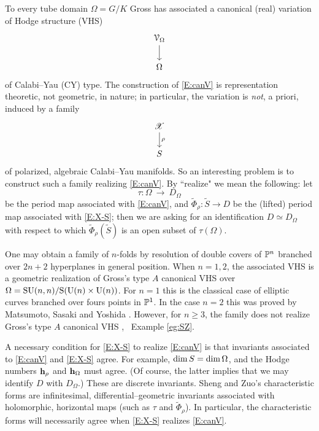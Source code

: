 \documentclass[12pt]{amsart}
\numberwithin{equation}{section}
\numberwithin{table}{section}
\numberwithin{figure}{section}
\begin{document}
To every tube domain $\Omega = G/K$ Gross \cite{MR1258484} has associated a canonical (real) variation of Hodge structure (VHS)
\begin{equation}\label{E:canV}
  \begin{tikzcd}  \cV_\Omega \arrow[d] \\ \Omega \end{tikzcd}
\end{equation}
of Calabi--Yau (CY) type.  The construction of \eqref{E:canV} is representation theoretic, not geometric, in nature; in particular, the variation is \emph{not}, a priori, induced by a family 
\begin{equation}\label{E:X-S}
  \begin{tikzcd}  \sX \arrow[d,"\rho"] \\ S \end{tikzcd}
\end{equation}
of polarized, algebraic Calabi--Yau manifolds.  So an interesting problem is to construct such a family realizing \eqref{E:canV}.  By ``realize" we mean the following: let 
\begin{equation}\label{E:itau}
  \tau : \Omega \ \to \ D_\Omega
\end{equation}
be the period map associated with \eqref{E:canV}, and $\tilde\Phi_\rho : \tilde S \to D$ be the (lifted) period map associated with \eqref{E:X-S}; then we are asking for an identification $D \simeq D_\Omega$ with respect to which $\tilde\Phi_\rho(\tilde S)$ is an open subset of $\tau(\Omega)$.  

\begin{example} \label{eg:CY}
One may obtain a family of  $n$-folds by resolution of double covers of $\mathbb P^n$ branched over $2n+2$ hyperplanes in general position.  When $n=1,2$, the associated VHS is a geometric realization of Gross's type $A$ canonical VHS over $\Omega = \mathrm{SU}(n,n)/\mathrm{S}(\mathrm{U}(n) \times \mathrm{U}(n))$.  For $n=1$ this is the classical case of elliptic curves branched over fours points in $\mathbb P^1$.  In the case $n=2$ this was proved by Matsumoto, Sasaki and Yoshida \cite{MR1136204}.  However, for $n\ge3$, the family does not realize Gross's type $A$ canonical VHS \cite{MR3004580, MR3303246}, \cf~Example \ref{eg:SZ}.
\end{example}  

A necessary condition for \eqref{E:X-S} to realize \eqref{E:canV} is that invariants associated to \eqref{E:canV} and \eqref{E:X-S} agree.  For example, $\mathrm{dim}\,S = \mathrm{dim}\,\Omega$, and the Hodge numbers $\mathbf{h}_\rho$ and $\mathbf{h}_\Omega$ must agree.  (Of course, the latter implies that we may identify $D$ with $D_\Omega$.)  These are discrete invariants.  Sheng and Zuo's characteristic forms \cite[\S3]{MR2657440} are infinitesimal, differential--geometric invariants associated with holomorphic, horizontal maps (such as $\tau$ and $\tilde\Phi_\rho$).  In particular, the characteristic forms will necessarily agree when \eqref{E:X-S} realizes \eqref{E:canV}.  
\end{document}
